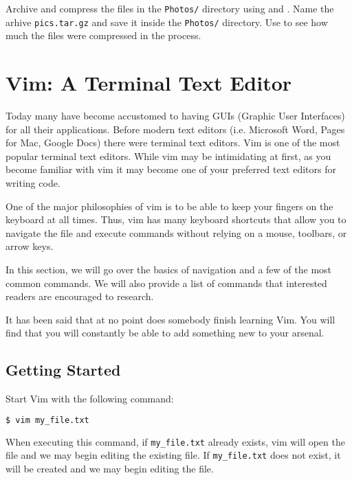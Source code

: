 \begin{problem}
Archive and compress the files in the \texttt{Photos/} directory using  and . Name the arhive \texttt{pics.tar.gz} and save it inside the \texttt{Photos/} directory. Use  to see how much the files were compressed in the process.
\end{problem}

\section*{Vim: A Terminal Text Editor} %

Today many have become accustomed to having GUIs (Graphic User Interfaces) for all their applications.
Before modern text editors (i.e. Microsoft Word, Pages for Mac, Google Docs) there were terminal text editors.
Vim is one of the most popular terminal text editors.
While vim may be intimidating at first, as you become familiar with vim it may become one of your preferred text editors for writing code.

One of the major philosophies of vim is to be able to keep your fingers on the keyboard at all times.
Thus, vim has many keyboard shortcuts that allow you to navigate the file and execute commands without relying on a mouse, toolbars, or arrow keys.

In this section, we will go over the basics of navigation and a few of the most common commands.
We will also provide a list of commands that interested readers are encouraged to research.

It has been said that at no point does somebody finish learning Vim.
You will find that you will constantly be able to add something new to your arsenal.

\subsection*{Getting Started} %

Start Vim with the following command:

\begin{lstlisting}[language=bash]
$ vim my_file.txt
\end{lstlisting}

When executing this command, if \texttt{my\_file.txt} already exists, vim will open the file and we may begin editing the existing file.
If \texttt{my\_file.txt} does not exist, it will be created and we may begin editing the file.

